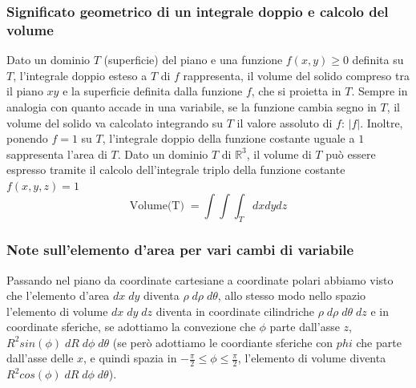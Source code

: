 \subsubsection{Significato geometrico di un integrale doppio e calcolo del volume}
Dato un dominio $T$ (superficie) del piano e una funzione $f(x,y) \geq 0$ definita su $T$, l'integrale doppio esteso a $T$ di $f$ rappresenta, il volume del solido compreso tra il piano $xy$ e la superficie definita dalla funzione $f$, che si proietta in $T$.\newline
\newline
Sempre in analogia con quanto accade in una variabile, se la funzione cambia segno in $T$, il volume del solido va calcolato integrando su $T$ il valore assoluto di $f$: $|f|$. Inoltre, ponendo $f = 1$ su $T$, l'integrale doppio della funzione costante uguale a $1$ sappresenta l'area di $T$.\newline
\newline
Dato un dominio $T$ di $\mathbb{R}^3$, il volume di $T$ può essere espresso  tramite il calcolo dell'integrale triplo della funzione costante $f(x,y,z) = 1$
\[
    \text{Volume(T)}\; = \int \int \int_{T} dx dy dz
\]
\subsubsection{Note sull'elemento d'area per vari cambi di variabile}
Passando nel piano da coordinate cartesiane a coordinate polari abbiamo visto che l'elemento d'area $dx \; dy$ diventa $\rho \; d \rho \;d \theta$, allo stesso modo nello spazio l'elemento di volume $dx \; dy \; dz$ diventa in coordinate cilindriche $\rho\; d \rho\; d \theta \; dz$ e in coordinate sferiche, se adottiamo la convezione che $\phi$ parte dall'asse $z$, $R^2 sin(\phi)\; dR \;d \phi \;d \theta$ (se però adottiamo le coordiante sferiche con $phi$ che parte dall'asse delle $x$, e quindi spazia in $-\frac{\pi}{2} \leq \phi \leq \frac{\pi}{2}$, l'elemento di volume diventa $R^2 cos(\phi) \;dR \;d \phi \;d \theta$).

